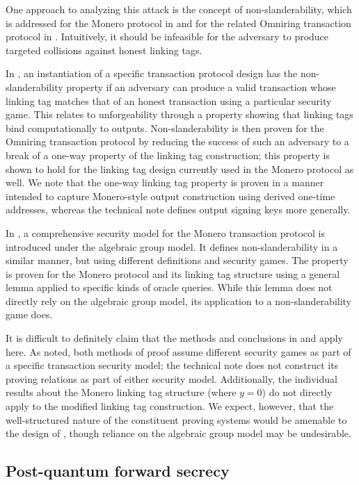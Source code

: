 \documentclass{article}
\theoremstyle{definition}
\begin{document}
One approach to analyzing this attack is the concept of non-slanderability, which is addressed for the Monero protocol in \cite{holistic} and for the related Omniring transaction protocol in \cite{omniring}.
Intuitively, it should be infeasible for the adversary to produce targeted collisions against honest linking tags.

In \cite{omniring}, an instantiation of a specific transaction protocol design has the non-slanderability property if an adversary can produce a valid transaction whose linking tag matches that of an honest transaction using a particular security game.
This relates to unforgeability through a property showing that linking tags bind computationally to outputs.
Non-slanderability is then proven for the Omniring transaction protocol by reducing the success of such an adversary to a break of a one-way property of the linking tag construction; this property is shown to hold for the linking tag design currently used in the Monero protocol as well.
We note that the one-way linking tag property is proven in a manner intended to capture Monero-style output construction using derived one-time addresses, whereas the technical note defines output signing keys more generally.

In \cite{holistic}, a comprehensive security model for the Monero transaction protocol is introduced under the algebraic group model.
It defines non-slanderability in a similar manner, but using different definitions and security games.
The property is proven for the Monero protocol and its linking tag structure using a general lemma applied to specific kinds of oracle queries.
While this lemma does not directly rely on the algebraic group model, its application to a non-slanderability game does.

It is difficult to definitely claim that the methods and conclusions in \cite{omniring} and \cite{holistic} apply here.
As noted, both methods of proof assume different security games as part of a specific transaction security model; the technical note does not construct its proving relations as part of either security model.
Additionally, the individual results about the Monero linking tag structure (where $y = 0$) do not directly apply to the modified linking tag construction.
We expect, however, that the well-structured nature of the constituent proving systems would be amenable to the design of \cite{holistic}, though reliance on the algebraic group model may be undesirable.


\subsection{Post-quantum forward secrecy}
\end{document}
